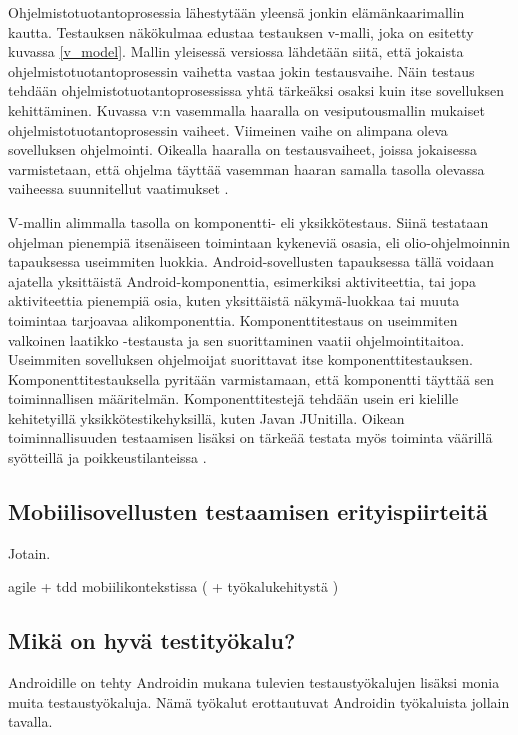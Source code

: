 Ohjelmistotuotantoprosessia lähestytään yleensä jonkin elämänkaarimallin kautta. Testauksen näkökulmaa edustaa testauksen v-malli, joka on esitetty kuvassa \ref{v_model}. Mallin yleisessä versiossa lähdetään siitä, että jokaista ohjelmistotuotantoprosessin vaihetta vastaa jokin testausvaihe. Näin testaus tehdään ohjelmistotuotantoprosessissa yhtä tärkeäksi osaksi kuin itse sovelluksen kehittäminen. Kuvassa v:n vasemmalla haaralla on vesiputousmallin mukaiset ohjelmistotuotantoprosessin vaiheet. Viimeinen vaihe on alimpana oleva sovelluksen ohjelmointi. Oikealla haaralla on testausvaiheet, joissa jokaisessa varmistetaan, että ohjelma täyttää vasemman haaran samalla tasolla olevassa vaiheessa suunnitellut vaatimukset \cite[39-42]{testing_foundations}.

V-mallin alimmalla tasolla on komponentti- eli yksikkötestaus. Siinä testataan ohjelman pienempiä itsenäiseen toimintaan kykeneviä osasia, eli olio-ohjelmoinnin tapauksessa useimmiten luokkia. Android-sovellusten tapauksessa tällä voidaan ajatella yksittäistä Android-komponenttia, esimerkiksi aktiviteettia, tai jopa aktiviteettia pienempiä osia, kuten yksittäistä näkymä-luokkaa tai muuta toimintaa tarjoavaa alikomponenttia. Komponenttitestaus on useimmiten valkoinen laatikko -testausta ja sen suorittaminen vaatii ohjelmointitaitoa. Useimmiten sovelluksen ohjelmoijat suorittavat itse komponenttitestauksen. Komponenttitestauksella pyritään varmistamaan, että komponentti täyttää sen toiminnallisen määritelmän. Komponenttitestejä tehdään usein eri kielille kehitetyillä yksikkötestikehyksillä, kuten Javan JUnitilla. Oikean toiminnallisuuden testaamisen lisäksi on tärkeää testata myös toiminta väärillä syötteillä ja poikkeustilanteissa \cite[43-46]{testing_foundations}.

\subsection{Mobiilisovellusten testaamisen erityispiirteitä}

Jotain.

agile + tdd mobiilikontekstissa (\cite{mobiled} + työkalukehitystä \cite{spataru10})

\subsection{Mikä on hyvä testityökalu?}

Androidille on tehty Androidin mukana tulevien testaustyökalujen lisäksi monia muita testaustyökaluja. Nämä työkalut erottautuvat Androidin työkaluista jollain tavalla.

